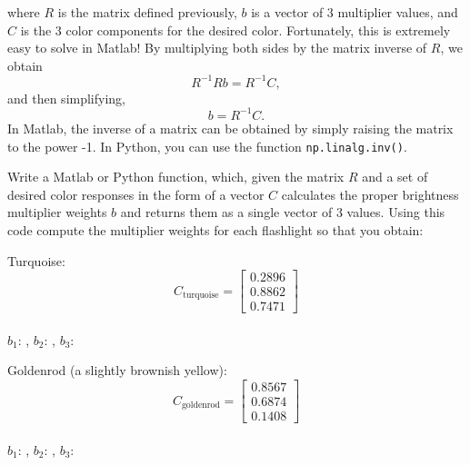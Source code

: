 \documentclass[10pt,letterpaper]{article}
\newcommand{\cmd}[1] {{\color{blue}\texttt{#1}}}
\begin{document}
\begin{enumerate}
where $R$ is the matrix defined previously, $b$ is a vector of 3 multiplier values, and $C$ is the 3 color components for the desired color. Fortunately, this is extremely easy to solve in Matlab! By multiplying both sides by the matrix inverse of $R$, we obtain
\[ R^{-1}Rb = R^{-1}C, \]
and then simplifying,
\[ b = R^{-1}C. \]
In Matlab, the inverse of a matrix can be obtained by simply raising the matrix to the power -1.
In Python, you can use the function \cmd{np.linalg.inv()}.

Write a Matlab or Python function, which, given the matrix $R$ and a
set of desired color responses in the form of a vector $C$ calculates the proper
brightness multiplier weights $b$ and returns them as a single vector of 3 values. Using this code compute the multiplier weights for each flashlight so that you  obtain:

Turquoise: 
\[
C_{\text{turquoise}} = \left[ \begin{array}{c} 0.2896 \\ 0.8862 \\ 0.7471 \end{array} \right]
\]\\

$b_1$: \underline{\hspace{3cm}}, $b_2$: \underline{\hspace{3cm}}, $b_3$:\underline{\hspace{3cm}}

\vspace{0.5in}
Goldenrod (a slightly brownish yellow): 
\[
C_{\text{goldenrod}} = \left[ \begin{array}{c} 0.8567 \\ 0.6874 \\ 0.1408 \end{array} \right]
\]\\

$b_1$: \underline{\hspace{3cm}}, $b_2$: \underline{\hspace{3cm}}, $b_3$:\underline{\hspace{3cm}}

\end{enumerate}
\end{document}
